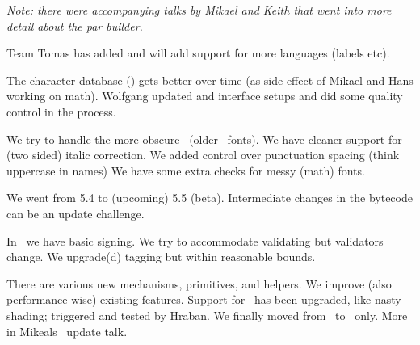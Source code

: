 {\em Note: there were accompanying talks by Mikael and Keith that went into more detail about the par builder.}

\stoptitle

\starttitle[title=Languages]

\startitemize
\startitem Team Tomas has added and will add support for more languages (labels etc). \stopitem
\stopitemize

\stoptitle

\starttitle[title=Data]

\startitemize
\startitem The character database () gets better over time (as side effect of Mikael and Hans working on math). \stopitem
\startitem Wolfgang updated and interface setups and did some quality control in the process. \stopitem
\stopitemize

\stoptitle

\starttitle[title=Fonts]

\startitemize
\startitem We try to handle the more obscure \CFF\ (older \TYPEONE\ fonts). \stopitem
\startitem We have cleaner support for (two sided) italic correction. \stopitem
\startitem We added control over punctuation spacing (think uppercase in names) \stopitem
\startitem We have some extra checks for messy (math) fonts. \stopitem
\stopitemize

\stoptitle

\starttitle[title=\LUA]

\startitemize
\startitem We went from 5.4 to (upcoming) 5.5 (beta). \stopitem
\startitem Intermediate changes in the bytecode can be an update challenge. \stopitem
\stopitemize

\stoptitle

\starttitle[title=\PDF]

\startitemize
\startitem In \LMTX\ we have basic signing. \stopitem
\startitem We try to accommodate validating but validators change. \stopitem
\startitem We upgrade(d) tagging but within reasonable bounds. \stopitem
\stopitemize

\stoptitle

\starttitle[title=\METAPOST]

\startitemize
\startitem There are various new mechanisms, primitives, and helpers. \stopitem
\startitem We improve (also performance wise) existing features. \stopitem
\startitem Support for \SVG\ has been upgraded, like nasty shading; triggered and tested by Hraban. \stopitem
\startitem We finally moved from \CWEB\ to \CCODE\ only. \stopitem
\startitem More in Mikeals \LUAMETAFUN\ update talk. \stopitem
\stopitemize


